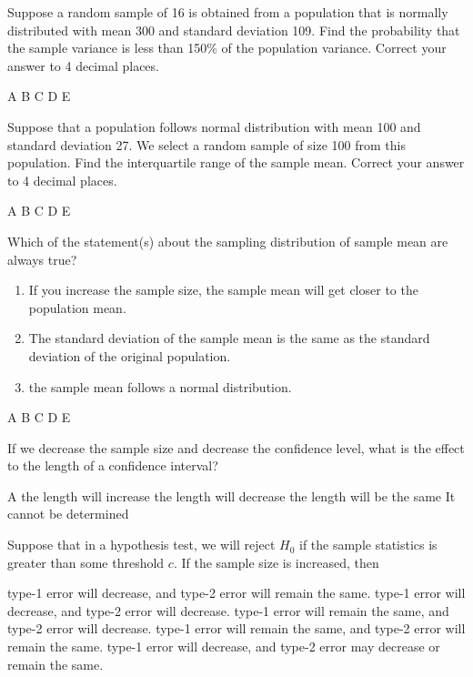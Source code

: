 \documentclass[letterpaper,10pt,addpoints]{exam}
\begin{document}
\begin{questions}
\question Suppose a random sample of 16 is obtained from a population that is normally distributed with mean 300 and standard deviation 109. Find the probability that the sample variance is less than 150\% of the population variance. Correct your answer to 4 decimal places.
\begin{choices}
  \choice A
  \choice B
  \choice C
  \choice D
  \choice E
\end{choices}

\question Suppose that a population follows normal distribution with mean 100 and standard deviation 27. We select a random sample of size 100 from this population. Find the interquartile range of the sample mean. Correct your answer to 4 decimal places.
\begin{choices}
  \choice A
  \choice B
  \choice C
  \choice D
  \choice E
\end{choices}


\question Which of the statement(s) about the sampling distribution of sample mean are always true?
\begin{enumerate}[I]
  \item If you increase the sample size, the sample mean will get closer to the population mean.
  \item The standard deviation of the sample mean is the same as the standard deviation of the original population.
  \item the sample mean follows a normal distribution.
\end{enumerate}
\begin{choices}
  \choice A
  \choice B
  \choice C
  \choice D
  \choice E
\end{choices}


\question If we decrease the sample size and decrease the confidence level, what is the effect to the length of a confidence interval?
\begin{choices}
  \choice A
  \choice the length will increase
  \choice the length will decrease
  \choice the length will be the same
  \choice It cannot be determined
\end{choices}

\question Suppose that in a hypothesis test, we will reject $H_0$ if the sample statistics is greater than some threshold $c$. If the sample size is increased, then 
\begin{choices}
  \choice type-1 error will decrease, and type-2 error will remain the same.
  \correctchoice type-1 error will decrease, and type-2 error will decrease.
  \choice type-1 error will remain the same, and type-2 error will decrease.
  \choice type-1 error will remain the same, and type-2 error will remain the same.
  \choice type-1 error will decrease, and type-2 error may decrease or remain the same.
\end{choices}


\end{questions}
\end{document}
